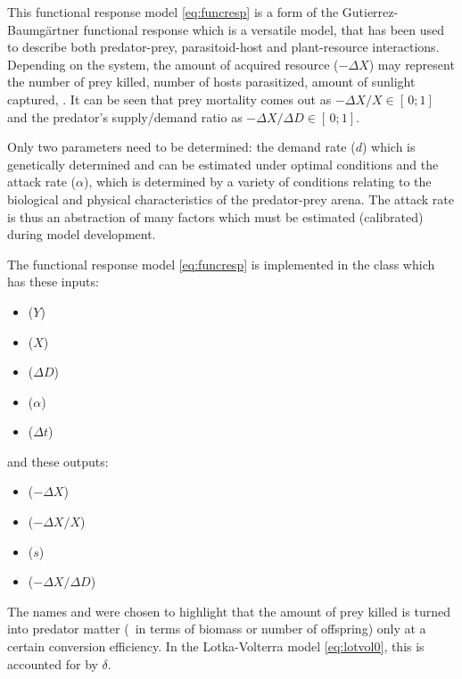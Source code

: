 This functional response model \eqref{eq:funcresp} is a form of the Gutierrez-Baumg{\"a}rtner functional response  \citep[][page~71]{Guti96} which is a versatile model, that has been used to describe both predator-prey, parasitoid-host and plant-resource interactions. Depending on the system, the amount of acquired resource ($-\Delta X$) may represent the number of prey killed, number of hosts parasitized, amount of sunlight captured, \etc. It can be seen that prey mortality comes out as $-\Delta X/X\in[\,0;1]$ and the predator's supply/demand ratio as $-\Delta X/\Delta D\in[\,0;1]$. 

Only two parameters need to be determined: the demand rate ($d$) which is genetically determined and can be estimated under optimal conditions and the attack rate ($\alpha$), which is determined by a variety of conditions relating to the biological and physical characteristics of the predator-prey arena. The attack rate is thus an abstraction of many factors which must be estimated (calibrated) during model development.

The functional response model \eqref{eq:funcresp} is implemented in the  class which has these inputs:
\begin{itemize}
\item {} ($Y$)
\item {} ($X$)
\item {} ($\Delta D$)
\item {} ($\alpha$)
\item {} ($\Delta t$)
\end{itemize}

\noindent and these outputs:
\begin{itemize}
\item {} ($-\Delta X$)
\item {} ($-\Delta X/X$)
\item {} ($s$)
\item {} ($-\Delta X/\Delta D$)
\end{itemize}

The names  and  were chosen to highlight that the amount of prey killed is turned into predator matter (\eg\ in terms of biomass or number of offspring) only at a certain  conversion efficiency. In the Lotka-Volterra model \eqref{eq:lotvol0}, this is accounted for by $\delta$.

